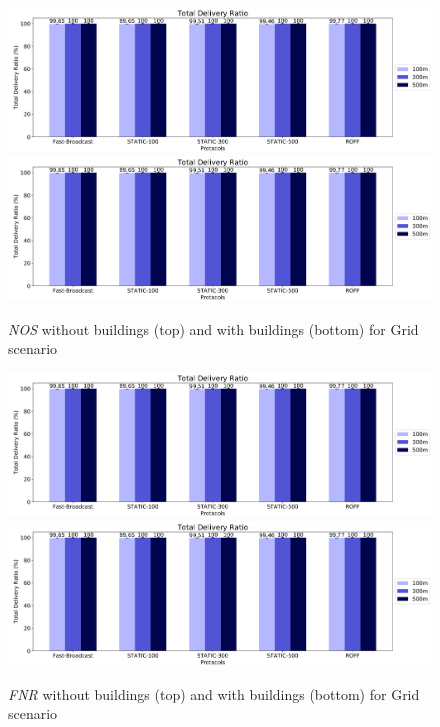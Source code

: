 		\begin{figure}[H]
			\centering
			\includegraphics[width=1.0\textwidth]{immagini/grid-300/b0/nos}
			\includegraphics[width=1.0\textwidth]{immagini/grid-300/b1/nos}
			\caption{\textit{NOS} without buildings (top) and with buildings (bottom) for Grid scenario}
			\label{fig:grid-nos}
		\end{figure}
	
		\begin{figure}[H]
			\centering
			\includegraphics[width=1.0\textwidth]{immagini/grid-300/b0/fnr}
			\includegraphics[width=1.0\textwidth]{immagini/grid-300/b1/fnr}
			\caption{\textit{FNR} without buildings (top) and with buildings (bottom) for Grid scenario}
			\label{fig:grid-fnr}
		\end{figure}
	

